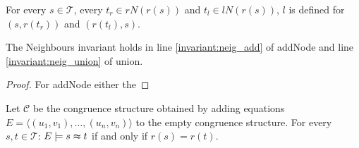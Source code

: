 \begin{invariant}[Neighbours]

For every $s \in \mathcal{T}$, every $t_r \in rN(r(s))$ and $t_l \in lN(r(s))$, $l$ is defined for $(s,r(t_r))$ and $(r(t_l),s)$.

\end{invariant}

\begin{proposition}

The Neighbours invariant holds in line \ref{invariant:neig_add} of addNode and line \ref{invariant:neig_union} of union.

\end{proposition}

\begin{proof}

For addNode either the 

\end{proof}

\begin{proposition}[Correctness]

Let $\mathcal{C}$ be the congruence structure obtained by adding equations $E = \langle (u_1,v_1), \ldots, (u_n,v_n) \rangle $ to the empty congruence structure.
For every $s,t \in \mathcal{T}$: $E \models s \thickapprox t$ if and only if $r(s) = r(t)$.

\end{proposition}

